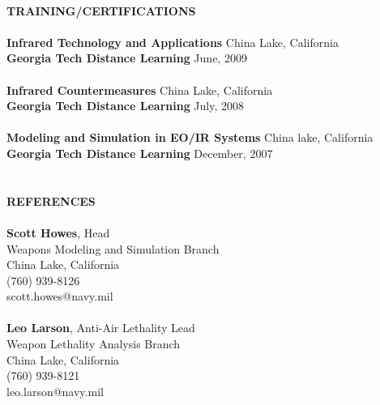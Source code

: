 \documentclass{article}
\begin{document}
\begin{tabbing}
                                                                              \\
\textbf{TRAINING/CERTIFICATIONS}                                              \\
                                                                              \\
\>\textbf{Infrared Technology and Applications}       \>China Lake, California\\
\>\textbf{Georgia Tech Distance Learning}             \>June, 2009            \\
                                                                              \\
\>\textbf{Infrared Countermeasures}                   \>China Lake, California\\
\>\textbf{Georgia Tech Distance Learning}             \>July, 2008            \\
                                                                              \\
\>\textbf{Modeling and Simulation in EO/IR Systems}   \>China lake, California\\
\>\textbf{Georgia Tech Distance Learning}             \>December, 2007        \\
                                                                              \\
                                                                              \\
\textbf{REFERENCES}                                                           \\
                                                                              \\
\>\textbf{Scott Howes}, Head                                                  \\
\>Weapons Modeling and Simulation Branch                                      \\
\>China Lake, California                                                      \\
\>(760) 939-8126                                                              \\
\>scott.howes@navy.mil                                                        \\
                                                                              \\
\>\textbf{Leo Larson}, Anti-Air Lethality Lead                                \\
\>Weapon Lethality Analysis Branch                                            \\
\>China Lake, California                                                      \\
\>(760) 939-8121                                                              \\
\>leo.larson@navy.mil                                                         \\
\end{tabbing}
\end{document}
